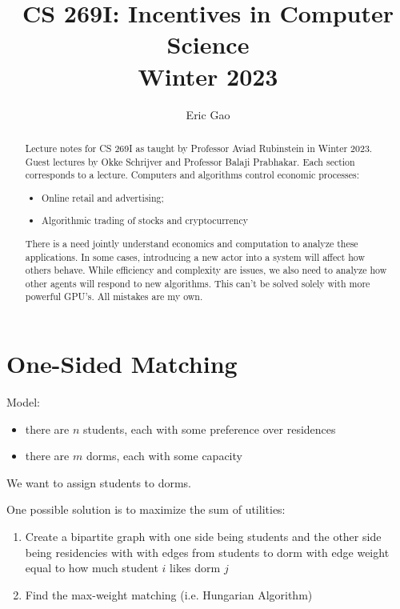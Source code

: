 \documentclass[dvipsnames]{article}
\title{CS 269I: Incentives in Computer Science \\
Winter 2023}
\author{Eric Gao}
\date{}
\theoremstyle{definition}
\theoremstyle{remark}
\newenvironment{mech}[1]{\begin{tcolorbox}[colback=red!5!white,colframe=red!75!black,title={#1}]}{\end{tcolorbox}}
\begin{document}
\maketitle

\begin{abstract}
	Lecture notes for CS 269I as taught by Professor Aviad Rubinstein in Winter 2023. Guest lectures by Okke Schrijver and Professor Balaji Prabhakar. Each section corresponds to a lecture. Computers and algorithms control economic processes:
	\begin{itemize}
		\item Online retail and advertising;
		\item Algorithmic trading of stocks and cryptocurrency
	\end{itemize}
	There is a need jointly understand economics and computation to analyze these applications. In some cases, introducing a new actor into a system will affect how others behave. While efficiency and complexity are issues, we also need to analyze how other agents will respond to new algorithms. This can't be solved solely with more powerful GPU's. All mistakes are my own. 
\end{abstract}

\tableofcontents

\newpage

\section{One-Sided Matching}

Model:
\begin{itemize}
	\item there are $n$ students, each with some preference over residences 
	\item there are $m$ dorms, each with some capacity
\end{itemize}
We want to assign students to dorms.

One possible solution is to maximize the sum of utilities:
\begin{mech}{Utility Maximization}
\begin{enumerate}
	\item Create a bipartite graph with one side being students and the other side being residencies with with edges from students to dorm with edge weight equal to how much student $i$ likes dorm $j$
	\item Find the max-weight matching (i.e. Hungarian Algorithm)
\end{enumerate}
\end{mech}
\end{document}

